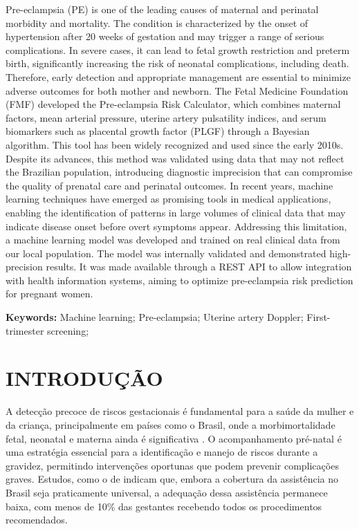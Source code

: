 \documentclass[12pt, a4paper]{report}
\theoremstyle{definition}
\theoremstyle{remark}
\theoremstyle{plain}
\begin{document}
\noindent Pre-eclampsia (PE) is one of the leading causes of maternal and perinatal morbidity and mortality. The condition is characterized by the onset of hypertension after 20 weeks of gestation and may trigger a range of serious complications. In severe cases, it can lead to fetal growth restriction and preterm birth, significantly increasing the risk of neonatal complications, including death. Therefore, early detection and appropriate management are essential to minimize adverse outcomes for both mother and newborn. The Fetal Medicine Foundation (FMF) developed the Pre-eclampsia Risk Calculator, which combines maternal factors, mean arterial pressure, uterine artery pulsatility indices, and serum biomarkers such as placental growth factor (PLGF) through a Bayesian algorithm. This tool has been widely recognized and used since the early 2010s. Despite its advances, this method was validated using data that may not reflect the Brazilian population, introducing diagnostic imprecision that can compromise the quality of prenatal care and perinatal outcomes. In recent years, machine learning techniques have emerged as promising tools in medical applications, enabling the identification of patterns in large volumes of clinical data that may indicate disease onset before overt symptoms appear. Addressing this limitation, a machine learning model was developed and trained on real clinical data from our local population. The model was internally validated and demonstrated high-precision results. It was made available through a REST API to allow integration with health information systems, aiming to optimize pre-eclampsia risk prediction for pregnant women.

\vspace*{0.5cm}

\noindent\textbf{Keywords:} Machine learning; Pre-eclampsia; Uterine artery Doppler; First-trimester screening;
\newpage


\tableofcontents \thispagestyle{empty} 


\chapter{INTRODUÇÃO}
\thispagestyle{myheadings}
 
A detecção precoce de riscos gestacionais é fundamental para a saúde da mulher e da criança, principalmente em países como o Brasil, onde a morbimortalidade fetal, neonatal e materna ainda é significativa \cite{Souza_Prestes_Santos_Cruz_2025}. O acompanhamento pré-natal é uma estratégia essencial para a identificação e manejo de riscos durante a gravidez, permitindo intervenções oportunas que podem prevenir complicações graves. Estudos, como o de \textcite{Viellas2014} indicam que, embora a cobertura da assistência no Brasil seja praticamente universal, a adequação dessa assistência permanece baixa, com menos de 10\% das gestantes recebendo todos os procedimentos recomendados.
\end{document}
